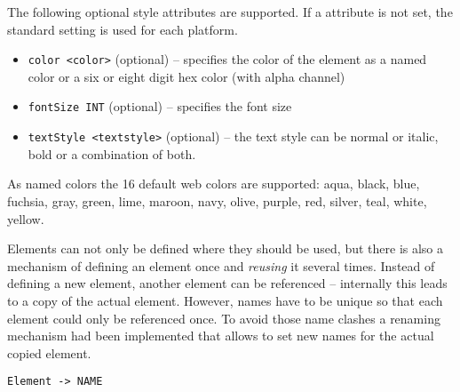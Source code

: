 The following optional style attributes are supported. If a attribute is not set, the standard setting is used for each platform.
\begin{itemize}
\item \lstinline!color <color>! (optional) -- specifies the color of the element as a named color or a six or eight digit hex color (with alpha channel)
\item \lstinline!fontSize INT! (optional) -- specifies the font size
\item \lstinline!textStyle <textstyle>! (optional) -- the text style can be normal or italic, bold or a combination of both.
\end{itemize}

As named colors the 16 default web colors are supported: aqua, black, blue, fuchsia, gray, green, lime, maroon, navy, olive, purple, red, silver, teal, white, yellow.

Elements can not only be defined where they should be used, but there is also a mechanism of defining an element once and \textit{reusing} it several times. Instead of defining a new element, another element can be referenced -- internally this leads to a copy of the actual element. However, names have to be unique so that each element could only be referenced once. To avoid those name clashes a renaming mechanism had been implemented that allows to set new names for the actual copied element.
\begin{lstlisting}
Element -> NAME
\end{lstlisting}
